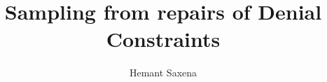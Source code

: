 \documentclass{vldb}
\begin{document}

\title{Sampling from repairs of Denial Constraints}



%
%
%
%



%
%
\author{
\alignauthor Hemant Saxena \\
	\\
}
\end{document}
